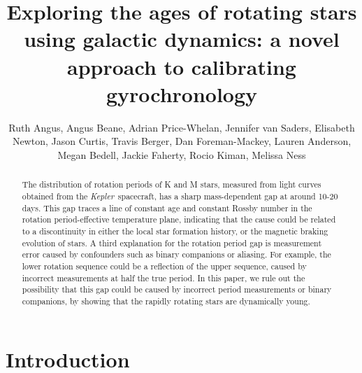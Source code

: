 \documentclass[useAMS, usenatbib, preprint, 12pt]{aastex}
\newcommand{\kepler}{{\it Kepler}}
\newcommand{\amnh}{1}
\newcommand{\cca}{2}
\newcommand{\hawaii}{3}
\begin{document}
\title{Exploring the ages of rotating stars using galactic dynamics: a novel
approach to calibrating gyrochronology}

\author{%
    Ruth Angus,
    Angus Beane,
    Adrian Price-Whelan,
    Jennifer van Saders,
    Elisabeth Newton,
    Jason Curtis,
    Travis Berger,
    Dan Foreman-Mackey,
    Lauren Anderson,
    Megan Bedell,
    Jackie Faherty,
    Rocio Kiman,
    Melissa Ness}



\begin{abstract}

The distribution of rotation periods of K and M stars, measured from light
curves obtained from the \kepler\ spacecraft, has a sharp mass-dependent gap
at around 10-20 days.
This gap traces a line of constant age and constant Rossby number in the
rotation period-effective temperature plane, indicating that the cause could
be related to a discontinuity in either the local star formation history, or
the magnetic braking evolution of stars.
A third explanation for the rotation period gap is measurement error caused by
confounders such as binary companions or aliasing.
For example, the lower rotation sequence could be a reflection of the upper
sequence, caused by incorrect measurements at half the true period.
In this paper, we rule out the possibility that this gap could be caused by
incorrect period measurements or binary companions, by showing that the
rapidly rotating stars are dynamically young.
\end{abstract}

\section{Introduction}
\end{document}
